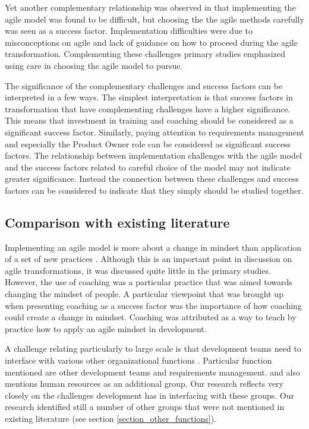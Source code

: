 Yet another complementary relationship was observed in that implementing the
agile model was found to be difficult, but choosing the the agile methods
carefully was seen as a success factor. Implementation difficulties were due to
misconceptions on agile and lack of guidance on how to proceed during the agile
transformation. Complementing these challenges primary studies emphasized
using care in choosing the agile model to pursue.


The significance of the complementary challenges and success factors can be
interpreted in a few ways. The simplest interpretation is that success factors
in transformation that have complementing challenges have a higher significance.
This means that investment in training and coaching should be considered as a
significant success factor. Similarly, paying attention to requirements
management and especially the Product Owner role can be considered as
significant success factors. The relationship between implementation challenges
with the agile model and the success factors related to careful choice of the
model may not indicate greater significance. Instead the connection between
these challenges and success factors can be considered to indicate that they
simply should be studied together.

\subsection{Comparison with existing literature}

Implementing an agile model is more about a change in mindset than application
of a set of new practices \citep{Misra2010}. Although this is an important point
in discussion on agile transformations, it was discussed quite little in the
primary studies. However, the use of coaching was a particular practice that was
aimed towards changing the mindset of people. A particular viewpoint that was
brought up when presenting coaching as a success factor was the importance of
how coaching could create a change in mindset. Coaching was attributed as a way
to teach by practice how to apply an agile mindset in development.

A challenge relating particularly to large scale is that development teams need
to interface with various other organizational functions \citep{Lindvall2004}.
Particular function mentioned are other development teams and requirements
management. \citet{Boehm2005} and also \citet{Cohn2003} mentions human resources
as an additional group.
Our research reflects very closely on the challenges development has in
interfacing with these groups. Our research identified still a number of other
groups that were not mentioned in existing literature (see section
\ref{section_other_functions}).

